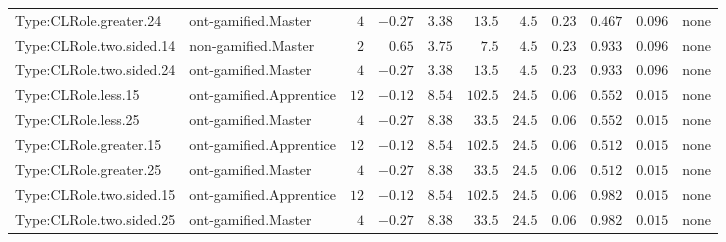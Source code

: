 \documentclass[6pt,a4paper]{article}
\begin{document}
{\begin{longtable}{llrrrrrrrrl}
Type:CLRole.greater.24&ont-gamified.Master&$ 4$&$-0.27$&$ 3.38$&$ 13.5$&$  4.5$&$ 0.23$&$0.467$&$0.096$&none\tabularnewline
Type:CLRole.two.sided.14&non-gamified.Master&$ 2$&$ 0.65$&$ 3.75$&$  7.5$&$  4.5$&$ 0.23$&$0.933$&$0.096$&none\tabularnewline
Type:CLRole.two.sided.24&ont-gamified.Master&$ 4$&$-0.27$&$ 3.38$&$ 13.5$&$  4.5$&$ 0.23$&$0.933$&$0.096$&none\tabularnewline
Type:CLRole.less.15&ont-gamified.Apprentice&$12$&$-0.12$&$ 8.54$&$102.5$&$ 24.5$&$ 0.06$&$0.552$&$0.015$&none\tabularnewline
Type:CLRole.less.25&ont-gamified.Master&$ 4$&$-0.27$&$ 8.38$&$ 33.5$&$ 24.5$&$ 0.06$&$0.552$&$0.015$&none\tabularnewline
Type:CLRole.greater.15&ont-gamified.Apprentice&$12$&$-0.12$&$ 8.54$&$102.5$&$ 24.5$&$ 0.06$&$0.512$&$0.015$&none\tabularnewline
Type:CLRole.greater.25&ont-gamified.Master&$ 4$&$-0.27$&$ 8.38$&$ 33.5$&$ 24.5$&$ 0.06$&$0.512$&$0.015$&none\tabularnewline
\newpage
Type:CLRole.two.sided.15&ont-gamified.Apprentice&$12$&$-0.12$&$ 8.54$&$102.5$&$ 24.5$&$ 0.06$&$0.982$&$0.015$&none\tabularnewline
Type:CLRole.two.sided.25&ont-gamified.Master&$ 4$&$-0.27$&$ 8.38$&$ 33.5$&$ 24.5$&$ 0.06$&$0.982$&$0.015$&none\tabularnewline
\hline
\end{longtable}}
\end{document}
